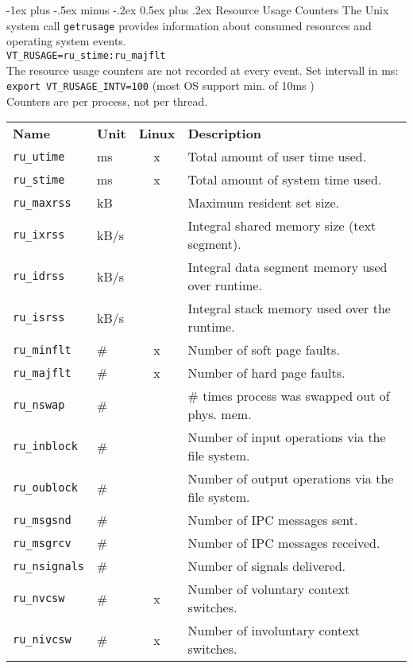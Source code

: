 \documentclass[a4paper,10pt,landscape]{article}
\makeatletter
\renewcommand{\section}{\@startsection{section}{1}{0mm}%
                                {-1ex plus -.5ex minus -.2ex}%
                                {0.5ex plus .2ex}%
                                {\normalfont\large\bfseries}}
\makeatother
\begin{document}
\begin{multicols}{3}
\section{Resource Usage Counters}
The Unix system call \texttt{getrusage} provides information about consumed  resources and operating system events.\\
\verb|VT_RUSAGE=ru_stime:ru_majflt|\\
The resource usage counters are not recorded at every event. Set intervall in ms:\\
\texttt{export VT\_RUSAGE\_INTV=100} (most OS support min. of 10ms )\\
Counters are per process, not per thread.
\begin{tabular}{@{}l@{}l@{ }c@{ }l@{}}
\textbf{Name}          &  \textbf{Unit}  & \textbf{Linux} & \textbf{Description}  \\
\texttt{ru\_utime}     &  ms             & x         & Total amount of user time used.  \\
\texttt{ru\_stime}     &  ms             & x         & Total amount of system time used.  \\
\texttt{ru\_maxrss}    &  kB             &           & Maximum resident set size. \\
\texttt{ru\_ixrss}     &  kB/s           &           & Integral shared memory size (text segment). \\
\texttt{ru\_idrss}     &  kB/s           &           & Integral data segment memory used over runtime. \\
\texttt{ru\_isrss}     &  kB/s           &           & Integral stack memory used over the runtime. \\
\texttt{ru\_minflt}    &  \#             & x         & Number of soft page faults. \\
\texttt{ru\_majflt}    &  \#             & x         & Number of hard page faults. \\
\texttt{ru\_nswap}     &  \#             &           & \# times process was swapped out of phys. mem. \\
\texttt{ru\_inblock}   &  \#             &           & Number of input operations via the file system. \\
\texttt{ru\_oublock}   &  \#             &           & Number of output operations via the file system. \\
\texttt{ru\_msgsnd}    &  \#             &           & Number of IPC messages sent. \\
\texttt{ru\_msgrcv}    &  \#             &           & Number of IPC messages received. \\
\texttt{ru\_nsignals}  &  \#             &           & Number of signals delivered. \\
\texttt{ru\_nvcsw}     &  \#             & x         & Number of voluntary context switches. \\
\texttt{ru\_nivcsw}    &  \#             & x         & Number of involuntary context switches. \\
\end{tabular}


\end{multicols}
\end{document}
